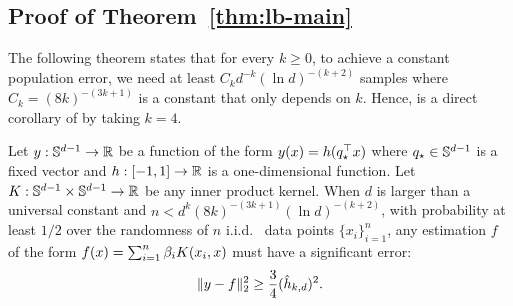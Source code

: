 \subsection{Proof of Theorem~\ref{thm:lb-main}}\label{app:pf-thm-lb}
The following theorem states that for every $k\ge 0$, to achieve a constant population error, we need at least $C_k d^{-k}(\ln d)^{-(k+2)}$ samples where $C_k=(8k)^{-(3k+1)}$ is a constant that only depends on $k$. Hence,  is a direct corollary of  by taking $k=4.$
\begin{theorem}\label{thm:lb}
Let $y:\mathbb{S}^{d-1}\to\mathbb{R}$ be a function of the form $y(x)=h(q_\star^\top x)$ where $q_\star\in\mathbb{S}^{d-1}$ is a fixed vector and $h:[-1,1]\to \mathbb{R}$ is a one-dimensional function. Let $K:\mathbb{S}^{d-1}\times\mathbb{S}^{d-1}\to \mathbb{R}$ be any inner product kernel. When $d$ is larger than a universal constant and $n<d^k(8k)^{-(3k+1)}(\ln d)^{-(k+2)}$, with probability at least $1/2$ over the randomness of $n$ i.i.d.~ data points $\{x_i\}_{i=1}^{n}$, any estimation $f$ of the form $f(x)=\sum_{i=1}^{n}\beta_i K(x_i,x)$ must have a significant error: $$\|y-f\|_2^2\ge \frac{3}{4}(\hat{h}_{k, d})^2.$$
\end{theorem}

